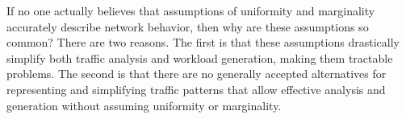 \documentclass[twocolumn,final]{svjour3}
\begin{document}

If no one actually believes that assumptions of uniformity and marginality accurately describe network behavior, then why are these assumptions so common?
There are two reasons.
The first is that these assumptions drastically simplify both traffic analysis and workload generation, making them tractable problems.
The second is that there are no generally accepted alternatives for representing and simplifying traffic patterns that allow effective analysis and generation without assuming uniformity or marginality.

\end{document}
